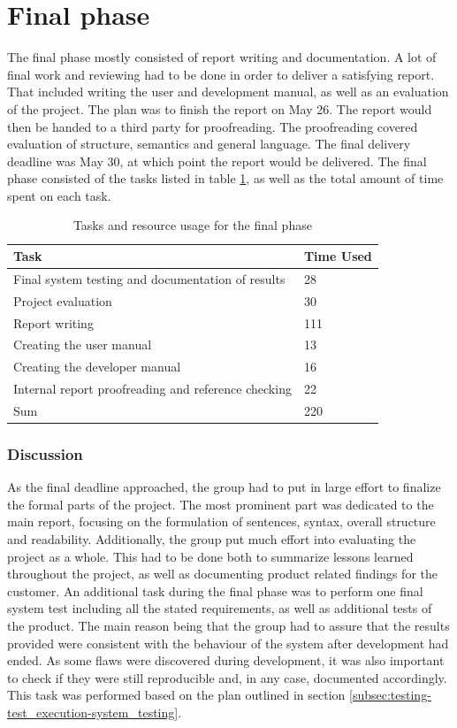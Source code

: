 \section{Final phase}

The final phase mostly consisted of report writing and documentation. A lot of final work and reviewing had to be done in order to deliver a satisfying report. That included writing the user and development manual, as well as an evaluation of the project. The plan was to finish the report on May 26. The report would then be handed to a third party for proofreading. The proofreading covered evaluation of structure, semantics and general language. The final delivery deadline was May 30, at which point the report would be delivered. The final phase consisted of the tasks listed in table \ref{tab:final_phase-tasks}, as well as the total amount of time spent on each task.

\begin{table}[ht!]
\small
\centering
\begin{tabular}{ | p{10cm} | p{2cm} |}
\hline
\rowcolor{lightgray}
\textbf{Task} & \textbf{Time Used} \\
\hline
Final system testing and documentation of results & 28 \\
Project evaluation & 30 \\
Report writing & 111 \\
Creating the user manual & 13 \\
Creating the developer manual & 16 \\
Internal report proofreading and reference checking & 22 \\
\hline \hline
Sum & 220 \\
\hline
\end{tabular}
\caption{Tasks and resource usage for the final phase}
\label{tab:final_phase-tasks}
\end{table}

\subsubsection{Discussion}

As the final deadline approached, the group had to put in large effort to finalize the formal parts of the project. The most prominent part was dedicated to the main report, focusing on the formulation of sentences, syntax, overall structure and readability. Additionally, the group put much effort into evaluating the project as a whole. This had to be done both to summarize lessons learned throughout the project, as well as documenting product related findings for the customer.
An additional task during the final phase was to perform one final system test including all the stated requirements, as well as additional tests of the product. The main reason being that the group had to assure that the results provided were consistent with the behaviour of the system after development had ended. As some flaws were discovered during development, it was also important to check if they were still reproducible and, in any case, documented accordingly. This task was performed based on the plan outlined in section \ref{subsec:testing-test_execution-system_testing}.
